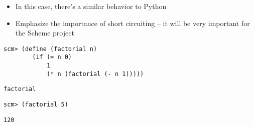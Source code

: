 \begin{guide}
\begin{itemize}
\item In this case, there's a similar behavior to Python
\item Emphasize the importance of short circuiting -- it will be very important for the Scheme project
\end{itemize}
\end{guide}


\begin{blocksection}
\begin{lstlisting}
scm> (define (factorial n)
        (if (= n 0)
            1
            (* n (factorial (- n 1)))))
\end{lstlisting}
\begin{solution}[.25in]
\texttt{factorial}
\end{solution}

\begin{lstlisting}
scm> (factorial 5)
\end{lstlisting}
\begin{solution}[.25in]
\texttt{120}
\end{solution}

\begin{comment}
\begin{lstlisting}
scm> (= 2 3)
\end{lstlisting}
\begin{solution}[.25in]
\texttt{\#f}
\end{solution}

\begin{lstlisting}
scm> (= '() '())
\end{lstlisting}
\begin{solution}[.25in]
\texttt{Error}
\end{solution}

\begin{lstlisting}
scm> (eq? '() '())
\end{lstlisting}
\begin{solution}[.25in]
\texttt{\#t}
\end{solution}

\begin{lstlisting}
scm> (eq? nil nil)
\end{lstlisting}
\begin{solution}[.25in]
\texttt{\#t}
\end{solution}

\begin{lstlisting}
scm> (eq? '() nil)
\end{lstlisting}
\begin{solution}[.25in]
\texttt{\#t}
\end{solution}


\end{comment}
\end{blocksection}
